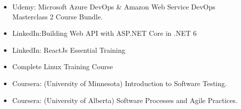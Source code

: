 \documentclass[5pt,oneside,a4paper,titlepage]{article}
\begin{document}
{\begin{minipage}{11.3cm}
    \begin{itemize}
        \item Udemy: Microsoft Azure DevOps \& Amazon Web Service DevOps Masterclass 2 Course Bundle.
        \item LinkedIn:Building Web API with ASP.NET Core in .NET 6
        \item LinkedIn: ReactJs Essential Training
        \item Complete Linux Training Course
        \item Coursera: (University of Minnesota) Introduction to
Software Testing.
        \item Coursera: (University of Alberta) Software Processes
and Agile Practices. 
    \end{itemize}
 
\end{minipage}}


\end{document}
